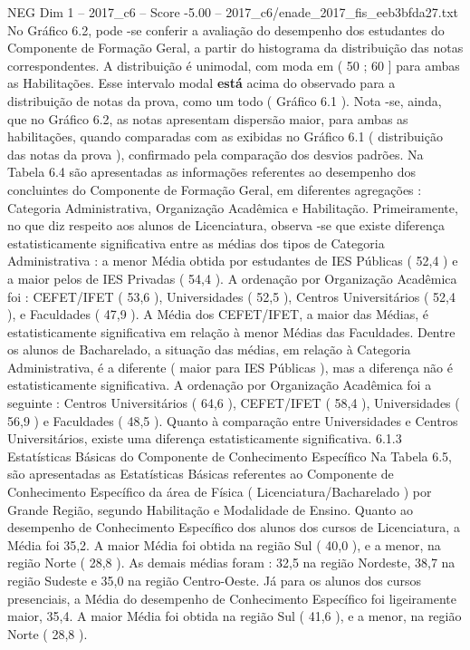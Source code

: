 \begin{textsample}{NEG Dim 1 – 2017\_c6 – Score -5.00 – 2017\_c6/enade\_2017\_fis\_eeb3bfda27.txt}
No Gráfico 6.2, pode -se conferir a avaliação do desempenho dos estudantes do Componente de Formação Geral, a partir do histograma da distribuição das notas correspondentes.
A distribuição é unimodal, com moda em ( 50 ; 60 ] para ambas as Habilitações.
Esse intervalo modal \textbf{está} acima do observado para a distribuição de notas da prova, como um todo ( Gráfico 6.1 ).
Nota -se, ainda, que no Gráfico 6.2, as notas apresentam dispersão maior, para ambas as habilitações, quando comparadas com as exibidas no Gráfico 6.1 ( distribuição das notas da prova ), confirmado pela comparação dos desvios padrões.
Na Tabela 6.4 são apresentadas as informações referentes ao desempenho dos concluintes do Componente de Formação Geral, em diferentes agregações : Categoria Administrativa, Organização Acadêmica e Habilitação.
Primeiramente, no que diz respeito aos alunos de Licenciatura, observa -se que existe diferença estatisticamente significativa entre as médias dos tipos de Categoria Administrativa : a menor Média obtida por estudantes de IES Públicas ( 52,4 ) e a maior pelos de IES Privadas ( 54,4 ).
A ordenação por Organização Acadêmica foi : CEFET/IFET ( 53,6 ), Universidades ( 52,5 ), Centros Universitários ( 52,4 ), e Faculdades ( 47,9 ).
A Média dos CEFET/IFET, a maior das Médias, é estatisticamente significativa em relação à menor Médias das Faculdades.
Dentre os alunos de Bacharelado, a situação das médias, em relação à Categoria Administrativa, é a diferente ( maior para IES Públicas ), mas a diferença não é estatisticamente significativa.
A ordenação por Organização Acadêmica foi a seguinte : Centros Universitários ( 64,6 ), CEFET/IFET ( 58,4 ), Universidades ( 56,9 ) e Faculdades ( 48,5 ).
Quanto à comparação entre Universidades e Centros Universitários, existe uma diferença estatisticamente significativa. 6.1.3 Estatísticas Básicas do Componente de Conhecimento Específico Na Tabela 6.5, são apresentadas as Estatísticas Básicas referentes ao Componente de Conhecimento Específico da área de Física ( Licenciatura/Bacharelado ) por Grande Região, segundo Habilitação e Modalidade de Ensino.
Quanto ao desempenho de Conhecimento Específico dos alunos dos cursos de Licenciatura, a Média foi 35,2.
A maior Média foi obtida na região Sul ( 40,0 ), e a menor, na região Norte ( 28,8 ).
As demais médias foram : 32,5 na região Nordeste, 38,7 na região Sudeste e 35,0 na região Centro-Oeste.
Já para os alunos dos cursos presenciais, a Média do desempenho de Conhecimento Específico foi ligeiramente maior, 35,4.
A maior Média foi obtida na região Sul ( 41,6 ), e a menor, na região Norte ( 28,8 ).

\end{textsample}
